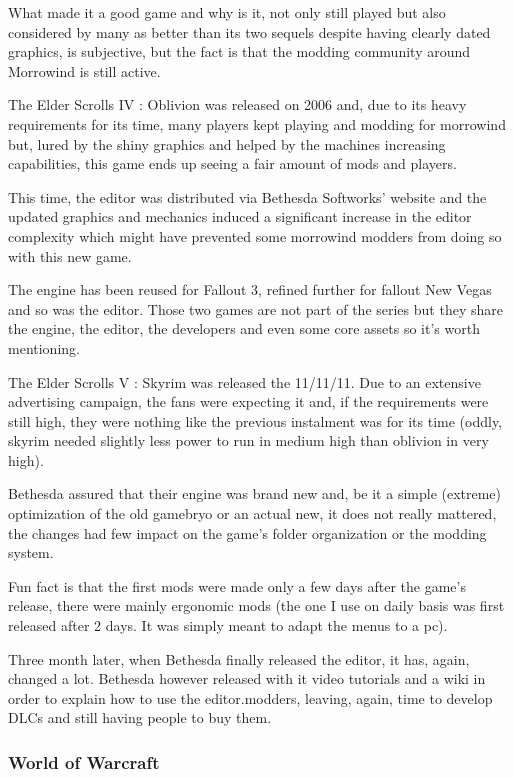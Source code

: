 \documentclass[a4paper,12pt]{article}
\begin{document}
What made it a good game and why is it, not only still played but also considered by many as better than its two sequels despite having clearly dated graphics, is subjective, but the fact is that the modding community around Morrowind is still active.

The Elder Scrolls IV : Oblivion was released on 2006 and, due to its heavy requirements for its time, many players kept playing and modding for morrowind but, lured by the shiny graphics and helped by the machines increasing capabilities, this game ends up seeing a fair amount of mods and players.

This time, the editor was distributed via Bethesda Softworks' website and the updated graphics and mechanics induced a significant increase in the editor complexity which might have prevented some morrowind modders from doing so with this new game.

The engine has been reused for Fallout 3, refined further for fallout New Vegas and so was the editor. Those two games are not part of the series but they share the engine, the editor, the developers and even some core assets so it's worth mentioning.


The Elder Scrolls V : Skyrim was released the 11/11/11. Due to an extensive advertising campaign, the fans were expecting it and, if the requirements were still high, they were nothing like the previous instalment was for its time (oddly, skyrim needed slightly less power to run in medium high than oblivion in very high).

Bethesda assured that their engine was brand new and, be it a simple (extreme) optimization of the old gamebryo or an actual new, it does not really mattered, the changes had few impact on the game's folder organization or the modding system.

Fun fact is that the first mods were made only a few days after the game's release, there were mainly ergonomic mods (the one I use on daily basis was first released after 2 days. It was simply meant to adapt the menus to a pc).

Three month later, when Bethesda finally released the editor, it has, again, changed a lot. Bethesda however released with it video tutorials and a wiki in order to explain how to use the editor.modders, leaving, again, time to develop DLCs and still having people to buy them.


\subsubsection{World of Warcraft}
\end{document}
